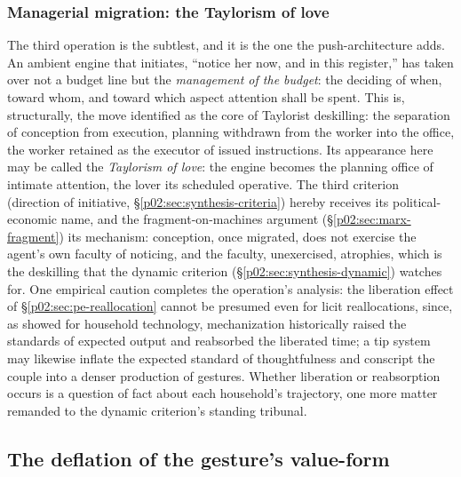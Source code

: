 \documentclass[11pt,a4paper]{article}
\newcommand{\term}[1]{\textit{\textcolor{pinkitalic}{#1}}}
\begin{document}
\subsubsection{Managerial migration: the Taylorism of love}
\label{p02:sec:pe-management}

The third operation is the subtlest, and it is the one the push-architecture adds. An ambient engine that initiates, ``notice her now, and in this register,'' has taken over not a budget line but the \emph{management of the budget}: the deciding of when, toward whom, and toward which aspect attention shall be spent. This is, structurally, the move \textcite{braverman1974labor} identified as the core of Taylorist deskilling: the separation of conception from execution, planning withdrawn from the worker into the office, the worker retained as the executor of issued instructions. Its appearance here may be called the \term{Taylorism of love}: the engine becomes the planning office of intimate attention, the lover its scheduled operative. The third criterion (direction of initiative, \S\ref{p02:sec:synthesis-criteria}) hereby receives its political-economic name, and the fragment-on-machines argument (\S\ref{p02:sec:marx-fragment}) its mechanism: conception, once migrated, does not exercise the agent's own faculty of noticing, and the faculty, unexercised, atrophies, which is the deskilling that the dynamic criterion (\S\ref{p02:sec:synthesis-dynamic}) watches for. One empirical caution completes the operation's analysis: the liberation effect of \S\ref{p02:sec:pe-reallocation} cannot be presumed even for licit reallocations, since, as \textcite{cowan1983more} showed for household technology, mechanization historically raised the standards of expected output and reabsorbed the liberated time; a tip system may likewise inflate the expected standard of thoughtfulness and conscript the couple into a denser production of gestures. Whether liberation or reabsorption occurs is a question of fact about each household's trajectory, one more matter remanded to the dynamic criterion's standing tribunal.

\subsection{The deflation of the gesture's value-form}
\label{p02:sec:pe-deflation}
\end{document}
